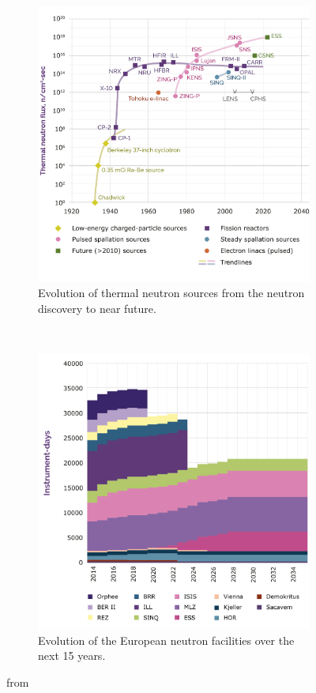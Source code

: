 \begin{figure}[!ht]
	\begin{subfigure}[t]{0.5\textwidth}
		\includegraphics[width=\textwidth]{01_Introduction/figures/fig000_NeutronSources_a}
		\caption{Evolution of thermal neutron sources from the neutron discovery to near future.}
		\label{}
	\end{subfigure}
	~
	\begin{subfigure}[t]{0.5\textwidth}
		\includegraphics[width=\textwidth]{01_Introduction/figures/fig000_NeutronSources_b}
		\caption{Evolution of the European neutron facilities over the next 15 years.}
		\label{}
	\end{subfigure}
	\caption[]{from \cite{neutron2016}}
	\label{chap1:fig:NeutronSources}
\end{figure}
